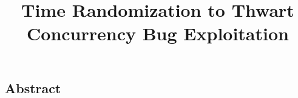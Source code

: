 \documentclass[letterpaper,twocolumn,10pt]{article}
\begin{document}
\title{\Large \bf Time Randomization to Thwart Concurrency Bug Exploitation}
\maketitle
\subsection*{Abstract}

\end{document}

